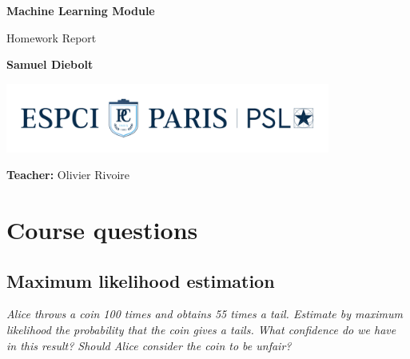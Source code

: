 \documentclass[12pt]{article}
\begin{document}
  \begin{titlepage}
    \begin{center}
      \vspace*{1cm}
 
      \Huge
      \textbf{Machine Learning Module}
 
      \vspace{0.5cm}
      \LARGE
      Homework Report
 
      \vspace{1.5cm}
 
      \textbf{Samuel Diebolt}
 
      \vfill
 
      \vspace{0.8cm}

      \includegraphics[width=0.8\textwidth]{espci_logo}
 
      \Large
      \textbf{Teacher:} Olivier Rivoire
    \end{center}
    \thispagestyle{empty}
  \end{titlepage}

  \section{Course questions}

  \subsection{Maximum likelihood estimation}

  \begin{displayquote}
    \itshape{}
    Alice throws a coin 100 times and obtains 55 times a tail. Estimate by
    maximum likelihood the probability that the coin gives a tails. What
    confidence do we have in this result? Should Alice consider the coin to be
    unfair?
  \end{displayquote}
\end{document}
